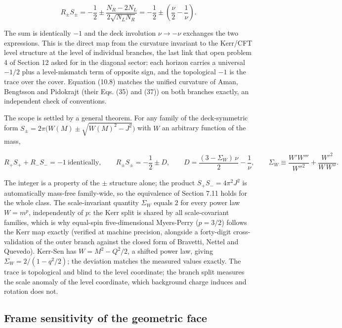 \documentclass[11pt]{article}
\begin{document}
\begin{equation*}
R_\pm S_\pm = -\frac{1}{2} \pm \frac{N_R - 2N_L}{2\sqrt{N_L N_R}} = -\frac{1}{2} \pm \left(\frac{\nu}{2} - \frac{1}{\nu}\right). \tag{10.8}
\end{equation*}

The sum is identically $-1$ and the deck involution $\nu \to -\nu$ exchanges the two expressions. This is the direct map from the curvature invariant to the Kerr/CFT level structure at the level of individual branches, the last link that open problem 4 of Section 12 asked for in the diagonal sector: each horizon carries a universal $-1/2$ plus a level-mismatch term of opposite sign, and the topological $-1$ is the trace over the cover. Equation (10.8) matches the unified curvature of Aman, Bengtsson and Pidokrajt (their Eqs. (35) and (37)) on both branches exactly, an independent check of conventions.

The scope is settled by a general theorem. For any family of the deck-symmetric form $S_\pm = 2\pi\bigl(W(M) \pm \sqrt{W(M)^2 - J^2}\bigr)$ with $W$ an arbitrary function of the mass,

\begin{equation*}
R_+S_+ + R_-S_- = -1 \ \text{identically}, \qquad R_\pm S_\pm = -\frac{1}{2} \pm D, \qquad D = \frac{(3 - \Sigma_W)\,\nu}{2} - \frac{1}{\nu}, \qquad \Sigma_W \equiv \frac{W' W'''}{W''^2} + \frac{W'^2}{W\,W''}. \tag{10.9}
\end{equation*}

The integer is a property of the $\pm$ structure alone; the product $S_+S_- = 4\pi^2 J^2$ is automatically mass-free family-wide, so the equivalence of Section 7.11 holds for the whole class. The scale-invariant quantity $\Sigma_W$ equals $2$ for every power law $W = m^p$, independently of $p$: the Kerr split is shared by all scale-covariant families, which is why equal-spin five-dimensional Myers-Perry ($p = 3/2$) follows the Kerr map exactly (verified at machine precision, alongside a forty-digit cross-validation of the outer branch against the closed form of Bravetti, Nettel and Quevedo). Kerr-Sen has $W = M^2 - Q^2/2$, a shifted power law, giving $\Sigma_W = 2/(1 - q^2/2)$; the deviation matches the measured values exactly. The trace is topological and blind to the level coordinate; the branch split measures the scale anomaly of the level coordinate, which background charge induces and rotation does not.

\subsection{Frame sensitivity of the geometric face}
\end{document}
